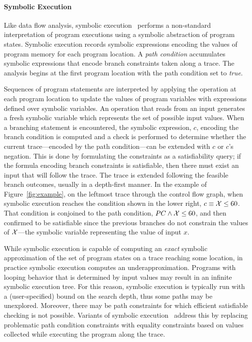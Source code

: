 \paragraph{Symbolic Execution}
Like data flow analysis, symbolic execution~\cite{king1976symbolic,clarke1976system} 
performs a non-standard interpretation of program executions using 
a symbolic abstraction of program states.
Symbolic execution records symbolic expressions encoding the
values of program memory for each program location.  
A \textit{path condition}
accumulates symbolic expressions that encode branch constraints 
taken along a trace.  
The analysis begins at the first
program location with the path condition set to \textit{true}.

Sequences of program statements are interpreted by applying the operation
at each program location to update the values of program
variables with expressions defined over symbolic variables.
An operation that reads from an input generates a fresh symbolic
variable which represents the set of possible input values.
When a branching statement is encountered, the symbolic expression, $c$, 
encoding the branch condition is computed and a check is performed
to determine whether the current trace---encoded by the path condition---can be
extended with $c$ or $c$'s negation.  
This is done by formulating the constraints
as a satisfiability query; if the formula encoding branch constraints
is satisfiable, then there must exist an input that will follow the trace.
The trace is extended following the feasible branch outcomes, usually
in a depth-first manner.
In the example of Figure~\ref{fig:example}, on the leftmost trace through
the control flow graph, when symbolic execution reaches the 
condition shown in the lower right, $c \equiv {\cal X} \le 60$.
That condition is conjoined to the path condition, $PC \wedge {\cal X} \le 60$,
and then confirmed to be satisfiable since the previous branches do
not constrain the values of ${\cal X}$---the symbolic variable representing
the value of input $x$.

While symbolic execution is capable of computing an \textit{exact} symbolic
approximation of the set of program states on a trace reaching some location, in
practice symbolic execution computes an underapproximation.
Programs with looping behavior that is determined by input values 
may result in an infinite symbolic execution tree. 
For this reason, symbolic execution is
typically run with a (user-specified) bound on the search depth, thus
some paths may be unexplored.   Moreover, there may be path constraints
for which efficient satisfiable checking is not possible.  Variants of
symbolic execution~\cite{godefroid2005dart,sen2005cute,song2008bitblaze} 
address this by replacing problematic path condition constraints with equality
constraints based on values collected while executing the program along the trace.

